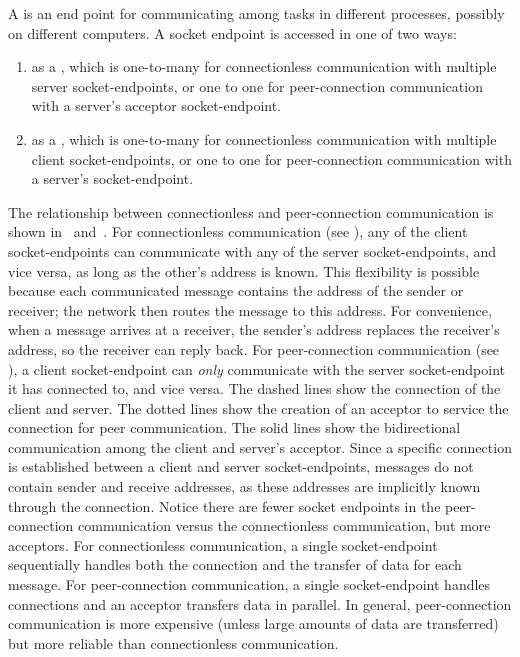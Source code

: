 \documentclass[openright,twoside]{report}
\begin{document}
A  is an end point for communicating among tasks in different processes, possibly on different computers.
A socket endpoint is accessed in one of two ways:
\begin{enumerate}
\item
as a , which is one-to-many for connectionless communication with multiple server socket-endpoints, or one to one for peer-connection communication with a server's acceptor socket-endpoint.
\item
as a , which is one-to-many for connectionless communication with multiple client socket-endpoints, or one to one for peer-connection communication with a server's \emph{} socket-endpoint.
\end{enumerate}
The relationship between connectionless and peer-connection communication is shown in ~and~.
For connectionless communication (see ), any of the client socket-endpoints can communicate with any of the server socket-endpoints, and vice versa, as long as the other's address is known.
This flexibility is possible because each communicated message contains the address of the sender or receiver;
the network then routes the message to this address.
For convenience, when a message arrives at a receiver, the sender's address replaces the receiver's address, so the receiver can reply back.
For peer-connection communication (see ), a client socket-endpoint can \emph{only} communicate with the server socket-endpoint it has connected to, and vice versa.
The dashed lines show the connection of the client and server.
The dotted lines show the creation of an acceptor to service the connection for peer communication.
The solid lines show the bidirectional communication among the client and server's acceptor.
Since a specific connection is established between a client and server socket-endpoints, messages do not contain sender and receive addresses, as these addresses are implicitly known through the connection.
Notice there are fewer socket endpoints in the peer-connection communication versus the connectionless communication, but more acceptors.
For connectionless communication, a single socket-endpoint sequentially handles both the connection and the transfer of data for each message.
For peer-connection communication, a single socket-endpoint handles connections and an acceptor transfers data in parallel.
In general, peer-connection communication is more expensive (unless large amounts of data are transferred) but more reliable than connectionless communication.
\end{document}
